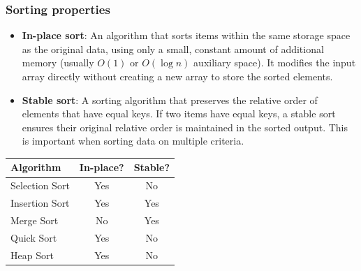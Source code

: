 \documentclass[8pt,aspectratio=169]{beamer}
\begin{document}
\begin{frame}
\frametitle{Sorting properties}
\begin{itemize}
	\item \textbf{In-place sort}: An algorithm that sorts items within the same storage space as the original data, using only a small, constant amount of additional memory (usually $O(1)$ or $O(\log n)$ auxiliary space). It modifies the input array directly without creating a new array to store the sorted elements.
	\item \textbf{Stable sort}: A sorting algorithm that preserves the relative order of elements that have equal keys. If two items have equal keys, a stable sort ensures their original relative order is maintained in the sorted output. This is important when sorting data on multiple criteria.
\end{itemize}
\vspace{0.5cm}
\centering
\begin{tabular}{l|c|c}
	\textbf{Algorithm} & \textbf{In-place?} & \textbf{Stable?} \\
	\hline
	Selection Sort & Yes & No \\
	Insertion Sort & Yes & Yes \\
	Merge Sort & No & Yes \\
	Quick Sort & Yes & No \\
	Heap Sort & Yes & No \\
\end{tabular}
\end{frame}
\end{document}
